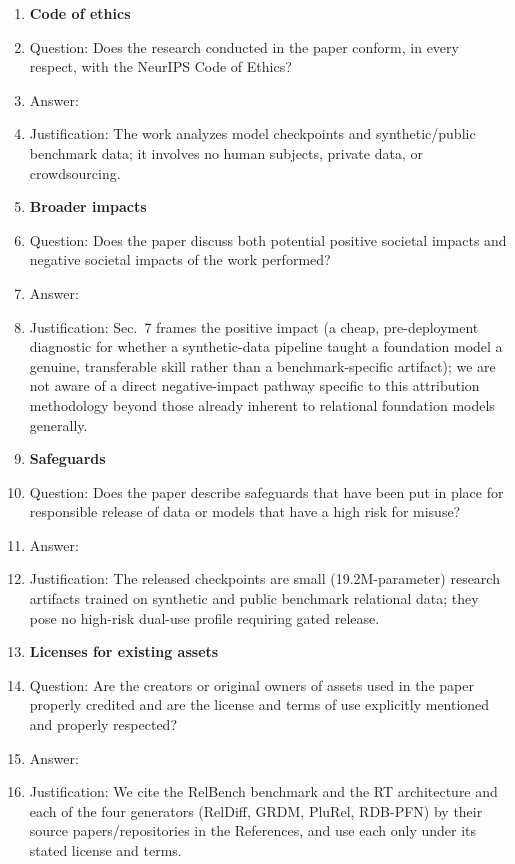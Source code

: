 \begin{enumerate}
\item {\bf Code of ethics}
    \item[] Question: Does the research conducted in the paper conform, in every respect, with the NeurIPS Code of Ethics?
    \item[] Answer: \answerYes{}
    \item[] Justification: The work analyzes model checkpoints and synthetic/public benchmark data; it involves no human subjects, private data, or crowdsourcing.

\item {\bf Broader impacts}
    \item[] Question: Does the paper discuss both potential positive societal impacts and negative societal impacts of the work performed?
    \item[] Answer: \answerYes{}
    \item[] Justification: Sec.~7 frames the positive impact (a cheap, pre-deployment diagnostic for whether a synthetic-data pipeline taught a foundation model a genuine, transferable skill rather than a benchmark-specific artifact); we are not aware of a direct negative-impact pathway specific to this attribution methodology beyond those already inherent to relational foundation models generally.

\item {\bf Safeguards}
    \item[] Question: Does the paper describe safeguards that have been put in place for responsible release of data or models that have a high risk for misuse?
    \item[] Answer: \answerNA{}
    \item[] Justification: The released checkpoints are small (19.2M-parameter) research artifacts trained on synthetic and public benchmark relational data; they pose no high-risk dual-use profile requiring gated release.

\item {\bf Licenses for existing assets}
    \item[] Question: Are the creators or original owners of assets used in the paper properly credited and are the license and terms of use explicitly mentioned and properly respected?
    \item[] Answer: \answerYes{}
    \item[] Justification: We cite the RelBench benchmark and the RT architecture and each of the four generators (RelDiff, GRDM, PluRel, RDB-PFN) by their source papers/repositories in the References, and use each only under its stated license and terms.


\end{enumerate}
